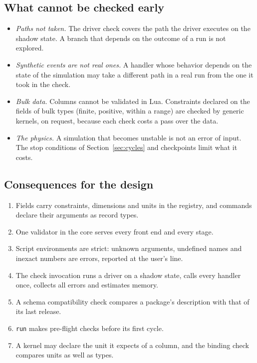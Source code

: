 \documentclass[11pt,a4paper]{article}
\newcommand{\code}[1]{\texttt{#1}}
\begin{document}
\subsection{What cannot be checked early}

\begin{itemize}
  \item \emph{Paths not taken.}  The driver check covers the path the driver
        executes on the shadow state.  A branch that depends on the outcome
        of a run is not explored.
  \item \emph{Synthetic events are not real ones.}  A handler whose
        behavior depends on the state of the simulation may take a
        different path in a real run from the one it took in the check.
  \item \emph{Bulk data.}  Columns cannot be validated in Lua.  Constraints
        declared on the fields of bulk types (finite, positive, within a
        range) are checked by generic kernels, on request, because each
        check costs a pass over the data.
  \item \emph{The physics.}  A simulation that becomes unstable is not an
        error of input.  The stop conditions of Section~\ref{sec:cycles} and
        checkpoints limit what it costs.
\end{itemize}

\subsection{Consequences for the design}

\begin{enumerate}
  \item Fields carry constraints, dimensions and units in the registry, and
        commands declare their arguments as record types.
  \item One validator in the core serves every front end and every stage.
  \item Script environments are strict: unknown arguments, undefined names
        and inexact numbers are errors, reported at the user's line.
  \item The check invocation runs a driver on a shadow state, calls every
        handler once, collects all errors and estimates memory.
  \item A schema compatibility check compares a package's description with
        that of its last release.
  \item \code{run} makes pre-flight checks before its first cycle.
  \item A kernel may declare the unit it expects of a column, and the
        binding check compares units as well as types.
\end{enumerate}
\end{document}
